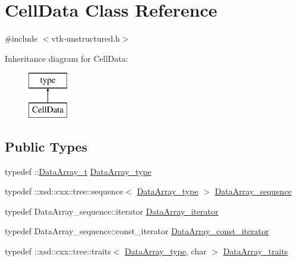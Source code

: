 \hypertarget{classCellData}{}\section{Cell\+Data Class Reference}
\label{classCellData}


{\ttfamily \#include $<$vtk-\/unstructured.\+h$>$}

Inheritance diagram for Cell\+Data\+:\begin{figure}[H]
\begin{center}
\leavevmode
\includegraphics[height=2.000000cm]{classCellData}
\end{center}
\end{figure}
\subsection*{Public Types}
\begin{DoxyCompactItemize}
\item 
typedef \+::\hyperlink{classDataArray__t}{Data\+Array\+\_\+t} \hyperlink{classCellData_a3b277b87cd25225dc944f250bd52057d}{Data\+Array\+\_\+type}
\item 
typedef \+::xsd\+::cxx\+::tree\+::sequence$<$ \hyperlink{classCellData_a3b277b87cd25225dc944f250bd52057d}{Data\+Array\+\_\+type} $>$ \hyperlink{classCellData_a52b0c8e18ccdb06ed9e6ae76cd809c4a}{Data\+Array\+\_\+sequence}
\item 
typedef Data\+Array\+\_\+sequence\+::iterator \hyperlink{classCellData_abe0f5b0713690cc81703132bcdccd51f}{Data\+Array\+\_\+iterator}
\item 
typedef Data\+Array\+\_\+sequence\+::const\+\_\+iterator \hyperlink{classCellData_a8213ea10f002fac23b5555ca0b2b2a21}{Data\+Array\+\_\+const\+\_\+iterator}
\item 
typedef \+::xsd\+::cxx\+::tree\+::traits$<$ \hyperlink{classCellData_a3b277b87cd25225dc944f250bd52057d}{Data\+Array\+\_\+type}, char $>$ \hyperlink{classCellData_a03e76eec5af05a6ac5512e9cb80300bd}{Data\+Array\+\_\+traits}
\end{DoxyCompactItemize}
